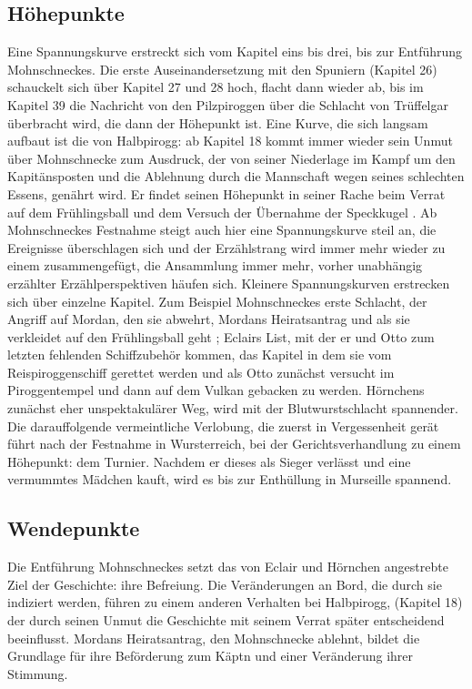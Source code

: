 \subsection{Höhepunkte}
Eine Spannungskurve erstreckt sich vom Kapitel eins bis drei, bis zur Entführung Mohnschneckes. Die erste Auseinandersetzung mit den Spuniern (Kapitel 26) schauckelt sich über Kapitel 27 und 28 hoch, flacht dann wieder ab, bis im Kapitel 39 die Nachricht von den Pilzpiroggen über die Schlacht von Trüffelgar überbracht wird, die dann der Höhepunkt ist. Eine Kurve, die sich langsam aufbaut ist die von Halbpirogg: ab Kapitel 18 kommt immer wieder sein Unmut über Mohnschnecke zum Ausdruck, der von seiner Niederlage im Kampf um den Kapitänsposten und die Ablehnung durch die Mannschaft wegen seines schlechten Essens,  genährt wird. Er findet seinen Höhepunkt in seiner Rache beim Verrat auf dem Frühlingsball und dem Versuch der Übernahme der Speckkugel . Ab Mohnschneckes Festnahme steigt auch hier eine Spannungskurve steil an, die Ereignisse überschlagen sich und der Erzählstrang wird immer mehr wieder zu einem zusammengefügt, die Ansammlung immer mehr, vorher unabhängig erzählter Erzählperspektiven häufen sich. Kleinere Spannungskurven erstrecken sich über einzelne Kapitel. Zum Beispiel Mohnschneckes erste Schlacht, der Angriff auf Mordan, den sie abwehrt, Mordans Heiratsantrag und als sie verkleidet auf den Frühlingsball geht ; Eclairs List, mit der er und Otto zum letzten fehlenden Schiffzubehör kommen, das Kapitel in dem sie vom Reispiroggenschiff gerettet werden und als Otto zunächst versucht im Piroggentempel und dann auf dem Vulkan gebacken zu werden. Hörnchens zunächst eher unspektakulärer Weg, wird mit der Blutwurstschlacht spannender. Die darauffolgende vermeintliche Verlobung, die zuerst in Vergessenheit gerät führt nach der Festnahme in Wursterreich, bei der Gerichtsverhandlung zu einem Höhepunkt: dem Turnier. Nachdem er dieses als Sieger verlässt und eine vermummtes Mädchen kauft, wird es bis zur Enthüllung in Murseille spannend.

\subsection{Wendepunkte}

Die Entführung Mohnschneckes setzt das von Eclair und Hörnchen angestrebte Ziel der Geschichte: ihre Befreiung.  Die Veränderungen an Bord, die durch sie indiziert werden, führen zu einem anderen Verhalten bei Halbpirogg, (Kapitel 18) der durch seinen Unmut die Geschichte mit seinem Verrat später entscheidend beeinflusst. Mordans Heiratsantrag, den Mohnschnecke ablehnt, bildet die Grundlage für ihre Beförderung zum Käptn und einer Veränderung ihrer Stimmung. 


